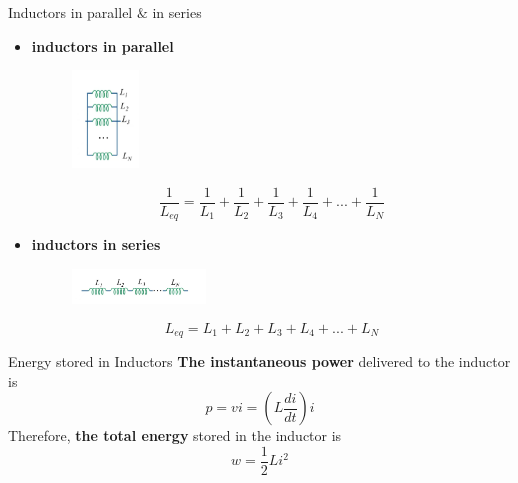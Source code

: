 \documentclass{beamer}
\begin{document}
    \begin{frame}{Inductors in parallel $\&$ in series}
    \begin{itemize}
        \item \textbf{inductors in parallel}
        \begin{figure}
        \centering
        \includegraphics[width=0.7in]{ycy/Chap6/f6.jpg}
        \end{figure}
        \begin{equation*}
            \frac{1}{L_{eq}}=\frac{1}{L_1}+\frac{1}{L_2}+\frac{1}{L_3}+\frac{1}{L_4}+...+\frac{1}{L_N}
        \end{equation*}
        
        \item \textbf{inductors in series}
        \begin{figure}
        \centering
        \includegraphics[width=1.4in]{ycy/Chap6/f7.jpg}
        \end{figure}
        \begin{equation*}
            L_{eq}=L_1+L_2+L_3+L_4+...+L_N
        \end{equation*}
        \end{itemize}
    \end{frame}
    \begin{frame}{Energy stored in Inductors}
    \textbf{The instantaneous power} delivered to the inductor is 
        \begin{equation*}
            p=vi=(L\frac{di}{dt})i
        \end{equation*}
        Therefore, \textbf{the total energy} stored in the inductor is 
        \begin{equation*}
            w=\frac{1}{2}Li^2
        \end{equation*}
    \end{frame}
    
\end{document}
